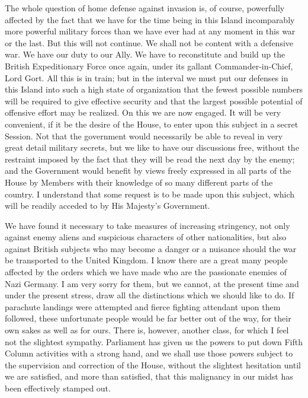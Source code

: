 \documentclass[a4paper]{amsbook}
\begin{document}
The whole question of home defense against invasion is, of course, powerfully affected by the fact that we have for the time being in this Island incomparably more powerful military forces than we have ever had at any moment in this war or the last. But this will not continue. We shall not be content with a defensive war. We have our duty to our Ally. We have to reconstitute and build up the British Expeditionary Force once again, under its gallant Commander-in-Chief, Lord Gort. All this is in train; but in the interval we must put our defenses in this Island into such a high state of organization that the fewest possible numbers will be required to give effective security and that the largest possible potential of offensive effort may be realized. On this we are now engaged. It will be very convenient, if it be the desire of the House, to enter upon this subject in a secret Session. Not that the government would necessarily be able to reveal in very great detail military secrets, but we like to have our discussions free, without the restraint imposed by the fact that they will be read the next day by the enemy; and the Government would benefit by views freely expressed in all parts of the House by Members with their knowledge of so many different parts of the country. I understand that some request is to be made upon this subject, which will be readily acceded to by His Majesty's Government.

We have found it necessary to take measures of increasing stringency, not only against enemy aliens and suspicious characters of other nationalities, but also against British subjects who may become a danger or a nuisance should the war be transported to the United Kingdom. I know there are a great many people affected by the orders which we have made who are the passionate enemies of Nazi Germany. I am very sorry for them, but we cannot, at the present time and under the present stress, draw all the distinctions which we should like to do. If parachute landings were attempted and fierce fighting attendant upon them followed, these unfortunate people would be far better out of the way, for their own sakes as well as for ours. There is, however, another class, for which I feel not the slightest sympathy. Parliament has given us the powers to put down Fifth Column activities with a strong hand, and we shall use those powers subject to the supervision and correction of the House, without the slightest hesitation until we are satisfied, and more than satisfied, that this malignancy in our midst has been effectively stamped out.
\end{document}
